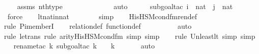 \begin{isabellebody}
\ \ \isamarkupfalse%
\ assms\ nth{\isacharunderscore}{\kern0pt}type\ \ \isanewline
\ \ \ \ \ \ \ \ \ \ \isamarkupfalse%
\ auto{\isacharbrackleft}{\kern0pt}{}{\isacharbrackright}{\kern0pt}\isanewline
\ \ \ \ \ \isamarkupfalse%
{\isacharparenleft}{\kern0pt}subgoal{\isacharunderscore}{\kern0pt}tac\ {\isachardoublequoteopen}i\ {\isasymin}\ nat\ {\isasymand}\ j\ {\isasymin}\ nat{\isachardoublequoteclose}{\isacharparenright}{\kern0pt}\isanewline
\ \ \ \ \ \ \isamarkupfalse%
\ force\isanewline
\ \ \isamarkupfalse%
\ lt{\isacharunderscore}{\kern0pt}nat{\isacharunderscore}{\kern0pt}in{\isacharunderscore}{\kern0pt}nat\ \isanewline
\ \ \ \ \ \isamarkupfalse%
\ simp\isanewline
\ \ \isamarkupfalse%
\ His{\isacharunderscore}{\kern0pt}HS{\isacharunderscore}{\kern0pt}M{\isacharunderscore}{\kern0pt}cond{\isacharunderscore}{\kern0pt}fm{\isacharunderscore}{\kern0pt}ren{\isacharunderscore}{\kern0pt}def\ \isanewline
\ \ \ \ \isamarkupfalse%
{\isacharparenleft}{\kern0pt}rule\ Pi{\isacharunderscore}{\kern0pt}memberI{\isacharparenright}{\kern0pt}\isanewline
\ \ \isamarkupfalse%
\ relation{\isacharunderscore}{\kern0pt}def\ function{\isacharunderscore}{\kern0pt}def\ \isanewline
\ \ \ \ \ \ \ \isamarkupfalse%
\ auto{\isacharbrackleft}{\kern0pt}{}{\isacharbrackright}{\kern0pt}\isanewline
\ \ \ \isamarkupfalse%
{\isacharparenleft}{\kern0pt}rule\ le{\isacharunderscore}{\kern0pt}trans{\isacharcomma}{\kern0pt}\ rule\ arity{\isacharunderscore}{\kern0pt}His{\isacharunderscore}{\kern0pt}HS{\isacharunderscore}{\kern0pt}M{\isacharunderscore}{\kern0pt}cond{\isacharunderscore}{\kern0pt}fm{\isacharcomma}{\kern0pt}\ simp{\isacharcomma}{\kern0pt}\ simp{\isacharparenright}{\kern0pt}\isanewline
\ \ \ \isamarkupfalse%
{\isacharparenleft}{\kern0pt}rule\ Un{\isacharunderscore}{\kern0pt}least{\isacharunderscore}{\kern0pt}lt{\isacharcomma}{\kern0pt}\ simp{\isacharcomma}{\kern0pt}\ simp{\isacharparenright}{\kern0pt}\isanewline
\ \ \isamarkupfalse%
{\isacharparenleft}{\kern0pt}rename{\isacharunderscore}{\kern0pt}tac\ k{\isacharcomma}{\kern0pt}\ subgoal{\isacharunderscore}{\kern0pt}tac\ {\isachardoublequoteopen}k\ {\isacharequal}{\kern0pt}\ {}\ {\isasymor}\ k\ {\isacharequal}{\kern0pt}\ {}{\isachardoublequoteclose}{\isacharparenright}{\kern0pt}\isanewline
\ \ \ \isamarkupfalse%
\ auto{\isacharbrackleft}{\kern0pt}{}{\isacharbrackright}{\kern0pt}\isanewline

\end{isabellebody}
